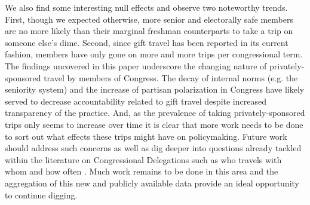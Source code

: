\documentclass[12pt]{article}                           %
\begin{document}
We also find some interesting null effects and observe two noteworthy trends. First, though we expected otherwise, more senior and electorally safe members are no more likely than their marginal freshman counterparts to take a trip on someone else's dime. Second, since gift travel has been reported in its current fashion, members have only gone on more and more trips per congressional term. The findings uncovered in this paper underscore the changing nature of privately-sponsored travel by members of Congress. The decay of internal norms (e.g. the seniority system) and the increase of partisan polarization in Congress have likely served to decrease accountability related to gift travel despite increased transparency of the practice. And, as the prevalence of taking privately-sponsored trips only seems to increase over time it is clear that more work needs to be done to sort out what effects these trips might have on policymaking. Future work should address such concerns as well as dig deeper into questions already tackled within the literature on Congressional Delegations such as who travels with whom and how often \citep{Alduncin2014,Alduncin2017}. Much work remains to be done in this area and the aggregation of this new and publicly available data provide an ideal opportunity to continue digging.

\newpage
\theendnotes

\newpage
\end{document}
